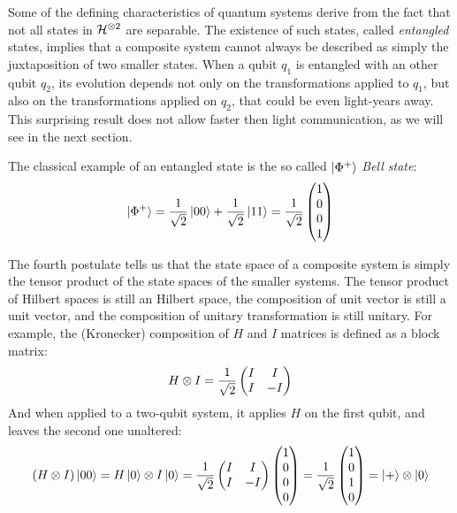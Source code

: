 Some of the defining characteristics of quantum systems derive from the fact that not all states in $\mathcal{H}^{\otimes 2}$ are separable. The existence of such states, called \textit{entangled} states, implies that a composite system cannot always be described as simply the juxtaposition of two smaller states. When a qubit $q_1$ is entangled with an other qubit $q_2$, its evolution depends not only on the transformations applied to $q_1$, but also on the transformations applied on $q_2$, that could be even light-years away. This surprising result does not allow faster then light communication, as we will see in the next section.

The classical example of an entangled state is the so called $\ket{\Phi^+}$ \textit{Bell state}:
\[\ket{\Phi^+} = \frac{1}{\sqrt{2}}\ket{00} + \frac{1}{\sqrt{2}}\ket{11} = \frac{1}{\sqrt{2}}\begin{pmatrix}
1 \\ 0 \\ 0\\ 1
\end{pmatrix}
\]

The fourth postulate tells us that the state space of a composite system is simply the tensor product of the state spaces of the smaller systems. The tensor product of Hilbert spaces is still an Hilbert space, the composition of unit vector is still a unit vector, and the composition of unitary transformation is still unitary. For example, the (Kronecker) composition of $H$ and $I$ matrices is defined as a block matrix:
\[	H\otimes I = \frac{1}{\sqrt{2}}\begin{pmatrix}
	I & I \\ I & -I
	\end{pmatrix}\]
And when applied to a two-qubit system, it applies $H$ on the first qubit, and leaves the second one unaltered:
\[ (H\otimes I) \ket{00} = H\ket{0} \otimes I\ket{0} = \frac{1}{\sqrt{2}} \begin{pmatrix}
	I & I \\ I & -I
	\end{pmatrix} \begin{pmatrix}
	1 \\ 0 \\0 \\0
	\end{pmatrix} = \frac{1}{\sqrt{2}} \begin{pmatrix}
	1 \\ 0 \\ 1 \\ 0
	\end{pmatrix} = \ket{+}\otimes\ket{0}
\]

